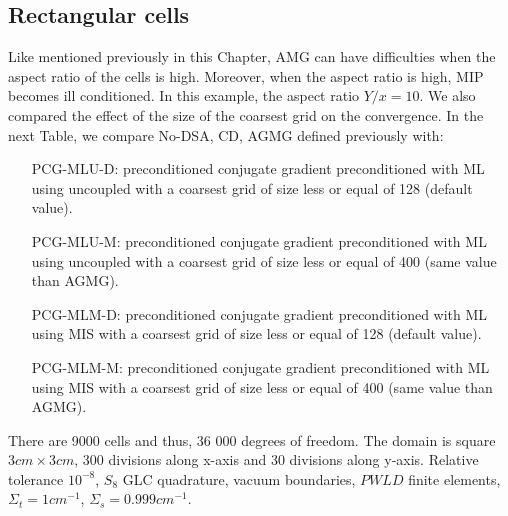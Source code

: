\subsection{Rectangular cells}
Like mentioned previously in this Chapter, AMG can have difficulties when the
aspect ratio of the cells is high. Moreover, when the aspect ratio is high,
MIP becomes ill conditioned. In this example, the aspect ratio $Y/x = 10$. We
also compared the effect of the size of the coarsest grid on the convergence.
In the next Table, we compare No-DSA, CD, AGMG defined previously with:
\begin{enumerate}
  \item[PCG-MLU-D:] preconditioned conjugate gradient preconditioned with ML
    using uncoupled with a coarsest grid of size less or equal of 128 (default
    value).
  \item[PCG-MLU-M:] preconditioned conjugate gradient preconditioned with ML
    using uncoupled with a coarsest grid of size less or equal of 400 (same 
    value than AGMG).
  \item[PCG-MLM-D:] preconditioned conjugate gradient preconditioned with ML
    using MIS with a coarsest grid of size less or equal of 128 (default
    value).
  \item[PCG-MLM-M:] preconditioned conjugate gradient preconditioned with ML
    using MIS with a coarsest grid of size less or equal of 400 (same 
    value than AGMG).
\end{enumerate}
There are 9000 cells and thus, 36 000 degrees of freedom. The domain is 
square $3cm \times 3cm$, 300 divisions along x-axis and 30 divisions along 
y-axis. Relative tolerance $10^{-8}$, $S_{8}$ GLC quadrature, vacuum 
boundaries, $PWLD$ finite elements, $\Sigma_t = 1 cm^{-1}$, 
$\Sigma_s = 0.999 cm^{-1}$.
